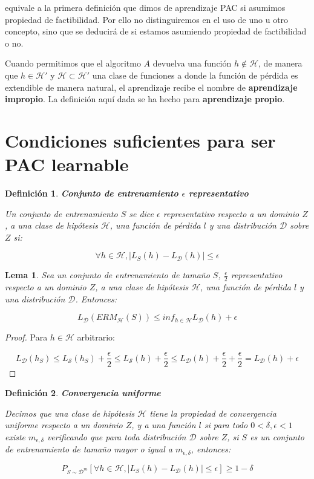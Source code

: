\documentclass[11pt]{article}
\newtheorem{lemma}{Lema}
\newtheorem{definition}{Definición}
\begin{document}
equivale a la primera definición que dimos de aprendizaje PAC si asumimos propiedad de factibilidad. Por ello no distinguiremos en el uso de uno u otro concepto, sino que se deducirá de si estamos asumiendo propiedad de factibilidad o no.

Cuando permitimos que el algoritmo $A$ devuelva una función $h \notin \mathcal{H}$, de manera que $h \in \mathcal{H}'$ y $\mathcal{H} \subset \mathcal{H}'$ una clase de funciones a donde la función de pérdida es extendible de manera natural, el aprendizaje recibe el nombre de \textbf{aprendizaje impropio}. La definición aquí dada se ha hecho para \textbf{aprendizaje propio}.

\section{Condiciones suficientes para ser PAC learnable}
\label{sec-4}
\begin{definition}
\textbf{Conjunto de entrenamiento $\epsilon$ representativo}

Un conjunto de entrenamiento $S$ se dice $\epsilon$ representativo respecto a un dominio $Z$, a una clase de hipótesis $\mathcal{H}$, una función de pérdida $l$ y una distribución $\mathcal{D}$ sobre $Z$ si:

\[\forall h\in \mathcal{H}, |L_S(h)-L_{\mathcal{D}}(h)| \le \epsilon\]
\end{definition}

\begin{lemma}
Sea un conjunto de entrenamiento de tamaño $S$, $\frac{\epsilon}{2}$ representativo respecto a un dominio $Z$, a una clase de hipótesis $\mathcal{H}$, una función de pérdida $l$ y una distribución $\mathcal{D}$. Entonces:

\[L_{\mathcal{D}} (ERM_{\mathcal{H}}(S)) \le inf_{h\in \mathcal{H}} L_{\mathcal{D}}(h) + \epsilon\]
\end{lemma}

\begin{proof}
Para $h \in \mathcal{H}$ arbitrario:

\[L_{\mathcal{D}}(h_S) \le L_{\mathcal{S}}(h_S) + \frac{\epsilon}{2} \le L_{\mathcal{S}}(h) + \frac{\epsilon}{2} \le L_{\mathcal{D}}(h) + \frac{\epsilon}{2} + \frac{\epsilon}{2} =  L_{\mathcal{D}}(h) + \epsilon\]
\end{proof}

\begin{definition}
\textbf{Convergencia uniforme}

Decimos que una clase de hipótesis $\mathcal{H}$ tiene la propiedad de convergencia uniforme respecto a un dominio $Z$, y a una función $l$ si para todo $0 < \delta, \epsilon < 1$ existe $m_{\epsilon, \delta}$ verificando que para toda distribución $\mathcal{D}$ sobre $Z$, si $S$ es un conjunto de entrenamiento de tamaño mayor o igual a $m_{\epsilon, \delta}$, entonces:

\[P_{S\sim \mathcal{D}^m} [\forall h\in \mathcal{H}, |L_S(h) - L_{\mathcal{D}}(h)| \le \epsilon] \ge 1-\delta\]
\end{definition}
\end{document}
